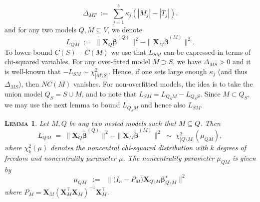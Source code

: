 \documentclass[aos]{imsart}
\theoremstyle{plain}
\newtheorem{lem}{\textsc{Lemma}}[section]
\newcommand{\E}{\mathbb{E}}
\newcommand{\bs}{\boldsymbol}
\begin{document}
\begin{equation}\label{eq:DeltaM}
\Delta_{MT}\;:=\;\sum_{j=1}^b \kappa_j(|M_j|-|T_j|). 
\end{equation}
and for any two models $Q,M\subseteq V$, we denote 
$$L_{QM}\;:=\;\|\bs X_{Q}\tilde{\bs\beta}^{(Q)}\|^2-\|\bs X_{M}\tilde{\bs\beta}^{(M)}\|^2.$$
To lower bound $C(S)-C(M)$ we use that $L_{SM}$ can be expressed in terms of chi-squared variables.
For any over-fitted model $M \supset S$, we have $\Delta_{MS}>0$ and it is well-known that $-L_{SM} \sim \chi_{|M \setminus S|}^2$. Hence, if one sets large enough $\kappa_j$ (and thus $\Delta_{MS}$), then $NC(M)$ vanishes. 
For non-overfitted  models, the idea is to take the union model $Q_S=S\cup M$, and to note that $L_{SM}=L_{Q_SM}-L_{Q_SS}$. Since $M \subset Q_S$, we may use the next lemma to bound $L_{Q_SM}$ and hence also $L_{SM}$.

\begin{lem}\label{lemma:s7}
    Let $M,Q$ be any two nested models such that $M \subseteq Q$. Then
$$
L_{QM}\;=\;\|\bs X_{Q}\tilde{\bs\beta}^{(Q)}\|^2-\|\bs X_{M}\tilde{\bs\beta}^{(M)}\|^2\;\sim\; \chi_{|Q\setminus M|}^2\left(\mu_{Q M}\right), 
$$
where $\chi_{k}^2(\mu)$ denotes the noncentral chi-squared distribution with $k$ degrees of freedom and noncentrality parameter $\mu$. The noncentrality parameter $\mu_{QM}$ is given by \begin{equation}\label{eq:muQM}
    \mu_{QM}\;\;:=\;\;\|\big(I_n-P_M\big) \bs X_{Q\setminus M} \bs \beta^{\star}_{Q\setminus M}\|^2
\end{equation}
where $P_M=\bs X_{M}\left(\bs X_{M}^{\top} \bs X_{M}\right)^{-1} \bs X_{M}^{\top}$.
\end{lem}
\end{document}
